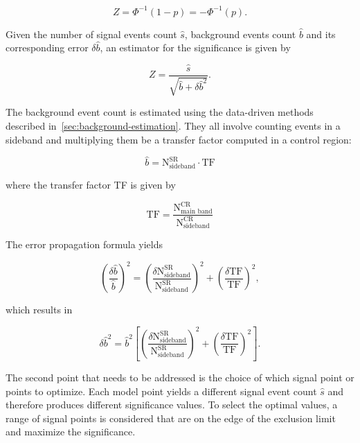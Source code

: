 \begin{equation}
Z = \Phi^{-1}(1-p)=-\Phi^{-1}(p).
\end{equation}

Given the number of signal events count $\hat{s}$, background events count $\hat{b}$ and its corresponding error $\delta \hat{b}$, an estimator for the significance is given by

\begin{equation}
Z = \frac{\hat{s}}{\sqrt{\hat{b}+\delta \hat{b}^2}}.
\end{equation}

The background event count is estimated using the data-driven methods described in~\ref{sec:background-estimation}. They all involve counting events in a sideband and multiplying them be a transfer factor computed in a control region:

\begin{equation}
\hat{b} = \mathrm{N}^{\mathrm{SR}}_{\text{sideband}}\cdot \mathrm{TF}
\end{equation}

where the transfer factor TF is given by 

\begin{equation}
\mathrm{TF}=\frac{\mathrm{N}^{\mathrm{CR}}_{\text{main band}}}{\mathrm{N}^{\mathrm{CR}}_{\text{sideband}}}
\end{equation}

The error propagation formula yields

\begin{equation}
\left( \frac{\delta \hat{b}}{\hat{b}}  \right)^2=\left( \frac{\delta \mathrm{N}^{\mathrm{SR}}_{\text{sideband}}}{\mathrm{N}^{\mathrm{SR}}_{\text{sideband}}}  \right)^2 + \left( \frac{\delta \mathrm{TF}}{\mathrm{TF}}  \right)^2,
\end{equation}

which results in

\begin{equation}
\delta \hat{b}^2=\hat{b}^2 \left[ \left( \frac{\delta \mathrm{N}^{\mathrm{SR}}_{\text{sideband}}}{\mathrm{N}^{\mathrm{SR}}_{\text{sideband}}}  \right)^2 + \left( \frac{\delta \mathrm{TF}}{\mathrm{TF}}  \right)^2 \right] .
\end{equation}

The second point that needs to be addressed is the choice of which signal point or points to optimize. Each model point yields a different signal event count $\hat{s}$ and therefore produces different significance values. To select the optimal values, a range of signal points is considered that are on the edge of the exclusion limit and maximize the significance.

